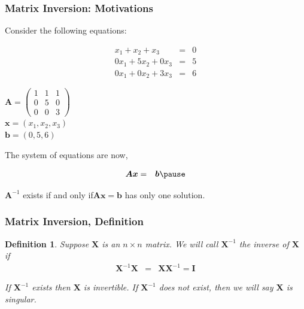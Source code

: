 \documentclass{beamer}
\newtheorem{defn}{Definition}
\numberwithin{equation}{section}
\begin{document}
\begin{frame}
\frametitle{Matrix Inversion: Motivations} 

Consider the following equations:

\begin{eqnarray}
x_{1} + x_{2} + x_{3} &=& 0 \nonumber \\
0x_{1} 	+ 	5x_{2} + 0x_{3}  & =& 5 \nonumber \\
0 x_{1} + 0 x_{2} + 3 x_{3} & = & 6 \nonumber
\end{eqnarray} \pause

$\boldsymbol{A}  = \begin{pmatrix} 1 & 1 & 1 \\ 0 & 5 & 0 \\ 0 & 0 & 3 \end{pmatrix} $   \\ \pause 
$\boldsymbol{x} = (x_{1} , x_{2}, x_{3} ) $ \\ \pause 
$\boldsymbol{b} = (0, 5, 6)$ \pause 

The system of equations are now, \pause 

\begin{eqnarray}
\boldsymbol{A}\boldsymbol{x} & = & \boldsymbol{b} \nonumber  \pause 
\end{eqnarray}

$\boldsymbol{A}^{-1}$ exists if and only if$\boldsymbol{A}\boldsymbol{x}  =  \boldsymbol{b}$ has only one solution.


\end{frame}



\begin{frame}
\frametitle{Matrix Inversion, Definition}

\begin{defn} Suppose $\boldsymbol{X}$ is an $n \times n$ matrix.  We will call $\boldsymbol{X}^{-1}$ the inverse of $\boldsymbol{X}$ if
\begin{eqnarray}
\boldsymbol{X}^{-1} \boldsymbol{X} & = & \boldsymbol{X} \boldsymbol{X}^{-1} = \boldsymbol{I} \nonumber 
\end{eqnarray}

If $\boldsymbol{X}^{-1}$ exists then $\boldsymbol{X}$ is invertible.  If $\boldsymbol{X}^{-1}$ does not exist, then we will say $\boldsymbol{X}$ is singular.  
\end{defn}

\end{frame}
\end{document}
